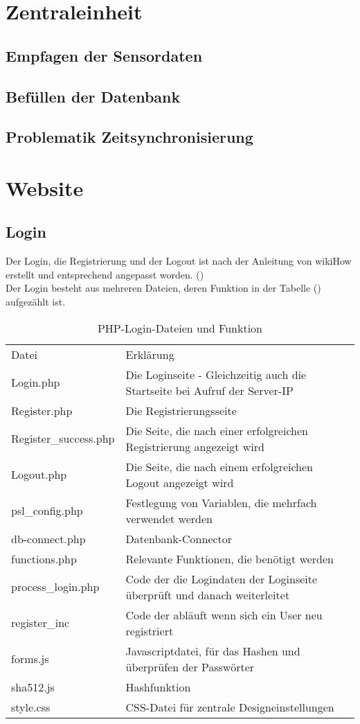 \section{Zentraleinheit}%
\subsection{Empfagen der Sensordaten}
\subsection{Befüllen der Datenbank}
\subsection{Problematik Zeitsynchronisierung}
 
\section{Website}

\subsection{Login}

Der Login, die Registrierung und der Logout ist nach der Anleitung von
wikiHow erstellt und entsprechend angepasst worden. (\cite{PHP-Login})
\\
Der Login besteht aus mehreren Dateien, deren Funktion in der Tabelle
() aufgezählt ist.

\begin{table}
\caption{PHP-Login-Dateien und Funktion}
\label{tab:Login-Dateien}
\begin{tabular}{p{} p{}}
Datei & Erklärung \\
Login.php & Die Loginseite - Gleichzeitig auch die Startseite bei Aufruf der
Server-IP\\
Register.php & Die Registrierungsseite \\
Register\_success.php & Die Seite, die nach einer erfolgreichen Registrierung
angezeigt wird \\
Logout.php & Die Seite, die nach einem erfolgreichen Logout angezeigt wird \\
psl\_config.php & Festlegung von Variablen, die mehrfach verwendet werden \\
db-connect.php & Datenbank-Connector \\
functions.php & Relevante Funktionen, die benötigt werden \\
process\_login.php & Code der die Logindaten der Loginseite überprüft und danach
weiterleitet \\
register\_inc & Code der abläuft wenn sich ein User neu registriert \\
forms.js & Javascriptdatei, für das Hashen und überprüfen der Passwörter \\
sha512.js & Hashfunktion \\
style.css & CSS-Datei für zentrale Designeinstellungen \\
 \end{tabular}
\end{table}


